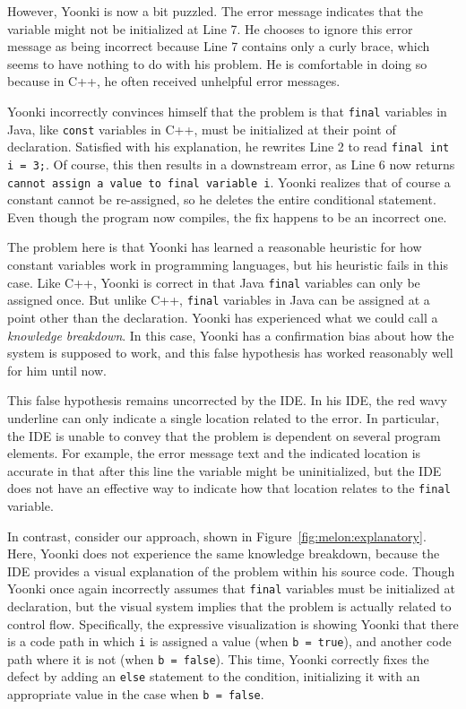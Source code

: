 \documentclass[conference]{IEEEtran}
\begin{document}
However, Yoonki is now a bit puzzled. The error message indicates that the variable might not be initialized at Line 7. He chooses to ignore this error message as being incorrect because Line 7 contains only a curly brace, which seems to have nothing to do with his problem. He is comfortable in doing so because in C++, he often received unhelpful error messages.

Yoonki incorrectly convinces himself that the problem is that \texttt{final} variables in Java, like \texttt{const} variables in C++, must be initialized at their point of declaration. Satisfied with his explanation, he rewrites Line 2 to read \texttt{final int i = 3;}. Of course, this then results in a downstream error, as Line 6 now returns \texttt{cannot assign a value to final variable i}. Yoonki realizes that of course a constant cannot be re-assigned, so he deletes the entire conditional statement. Even though the program now compiles, the fix happens to be an incorrect one.

The problem here is that Yoonki has learned a reasonable heuristic for how constant variables work in programming languages, but his heuristic fails in this case. Like C++, Yoonki is correct in that Java \texttt{final} variables can only be assigned once. But unlike C++, \texttt{final} variables in Java can be assigned at a point other than the declaration. Yoonki has experienced what we could call a \textit{knowledge breakdown}. In this case, Yoonki has a confirmation bias about how the system is supposed to work, and this false hypothesis has worked reasonably well for him until now.

This false hypothesis remains uncorrected by the IDE. In his IDE, the red wavy underline can only indicate a single location related to the error. In particular, the IDE is unable to convey that the problem is dependent on several program elements. For example, the error message text and the indicated location is accurate in that after this line the variable might be uninitialized, but the IDE does not have an effective way to indicate how that location relates to the \texttt{final} variable.

In contrast, consider our approach, shown in Figure~\ref{fig:melon:explanatory}. Here, Yoonki does not experience the same knowledge breakdown, because the IDE provides a visual explanation of the problem within his source code. Though Yoonki once again incorrectly assumes that \texttt{final} variables must be initialized at declaration, but the visual system implies that the problem is actually related to control flow. Specifically, the expressive visualization is showing Yoonki that there is a code path in which \texttt{i} is assigned a value (when \texttt{b = true}), and another code path where it is not (when \texttt{b = false}). This time, Yoonki correctly fixes the defect by adding an \texttt{else} statement to the condition, initializing it with an appropriate value in the case when \texttt{b = false}.
\end{document}
